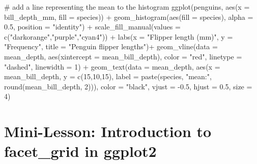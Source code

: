 \documentclass[
  letterpaper,
  DIV=11,
  numbers=noendperiod]{scrreprt}
\newenvironment{Shaded}{\begin{snugshade}}{\end{snugshade}}
\newcommand{\AttributeTok}[1]{\textcolor[rgb]{0.40,0.45,0.13}{#1}}
\newcommand{\CommentTok}[1]{\textcolor[rgb]{0.37,0.37,0.37}{#1}}
\newcommand{\DecValTok}[1]{\textcolor[rgb]{0.68,0.00,0.00}{#1}}
\newcommand{\FloatTok}[1]{\textcolor[rgb]{0.68,0.00,0.00}{#1}}
\newcommand{\FunctionTok}[1]{\textcolor[rgb]{0.28,0.35,0.67}{#1}}
\newcommand{\NormalTok}[1]{\textcolor[rgb]{0.00,0.23,0.31}{#1}}
\newcommand{\SpecialCharTok}[1]{\textcolor[rgb]{0.37,0.37,0.37}{#1}}
\newcommand{\StringTok}[1]{\textcolor[rgb]{0.13,0.47,0.30}{#1}}
\begin{document}
\begin{tcolorbox}
\begin{Shaded}
\begin{Highlighting}[]
\CommentTok{\# add a line representing the mean to the histogram}
\FunctionTok{ggplot}\NormalTok{(penguins, }\FunctionTok{aes}\NormalTok{(}\AttributeTok{x =}\NormalTok{ bill\_depth\_mm, }\AttributeTok{fill =}\NormalTok{ species)) }\SpecialCharTok{+}
  \FunctionTok{geom\_histogram}\NormalTok{(}\FunctionTok{aes}\NormalTok{(}\AttributeTok{fill =}\NormalTok{ species), }\AttributeTok{alpha =} \FloatTok{0.5}\NormalTok{, }\AttributeTok{position =} \StringTok{"identity"}\NormalTok{) }\SpecialCharTok{+}
  \FunctionTok{scale\_fill\_manual}\NormalTok{(}\AttributeTok{values =} \FunctionTok{c}\NormalTok{(}\StringTok{"darkorange"}\NormalTok{,}\StringTok{"purple"}\NormalTok{,}\StringTok{"cyan4"}\NormalTok{)) }\SpecialCharTok{+}
  \FunctionTok{labs}\NormalTok{(}\AttributeTok{x =} \StringTok{"Flipper length (mm)"}\NormalTok{,}
     \AttributeTok{y =} \StringTok{"Frequency"}\NormalTok{,}
     \AttributeTok{title =} \StringTok{"Penguin flipper lengths"}\NormalTok{)}\SpecialCharTok{+}
  \FunctionTok{geom\_vline}\NormalTok{(}\AttributeTok{data =}\NormalTok{ mean\_depth, }\FunctionTok{aes}\NormalTok{(}\AttributeTok{xintercept =}\NormalTok{ mean\_bill\_depth),}
     \AttributeTok{color =} \StringTok{"red"}\NormalTok{, }\AttributeTok{linetype =} \StringTok{"dashed"}\NormalTok{, }\AttributeTok{linewidth =} \DecValTok{1}\NormalTok{) }\SpecialCharTok{+}
  \FunctionTok{geom\_text}\NormalTok{(}\AttributeTok{data =}\NormalTok{ mean\_depth, }\FunctionTok{aes}\NormalTok{(}\AttributeTok{x =}\NormalTok{ mean\_bill\_depth, }\AttributeTok{y =} \FunctionTok{c}\NormalTok{(}\DecValTok{15}\NormalTok{,}\DecValTok{10}\NormalTok{,}\DecValTok{15}\NormalTok{),}
     \AttributeTok{label =} \FunctionTok{paste}\NormalTok{(species, }\StringTok{"mean:"}\NormalTok{, }\FunctionTok{round}\NormalTok{(mean\_bill\_depth, }\DecValTok{2}\NormalTok{))),}
     \AttributeTok{color =} \StringTok{"black"}\NormalTok{, }\AttributeTok{vjust =} \SpecialCharTok{{-}}\FloatTok{0.5}\NormalTok{, }
     \AttributeTok{hjust =} \FloatTok{0.5}\NormalTok{, }\AttributeTok{size =} \DecValTok{4}\NormalTok{) }
\end{Highlighting}
\end{Shaded}

\end{tcolorbox}

\section{Mini-Lesson: Introduction to facet\_grid in
ggplot2}\label{mini-lesson-introduction-to-facet_grid-in-ggplot2}
\end{document}
